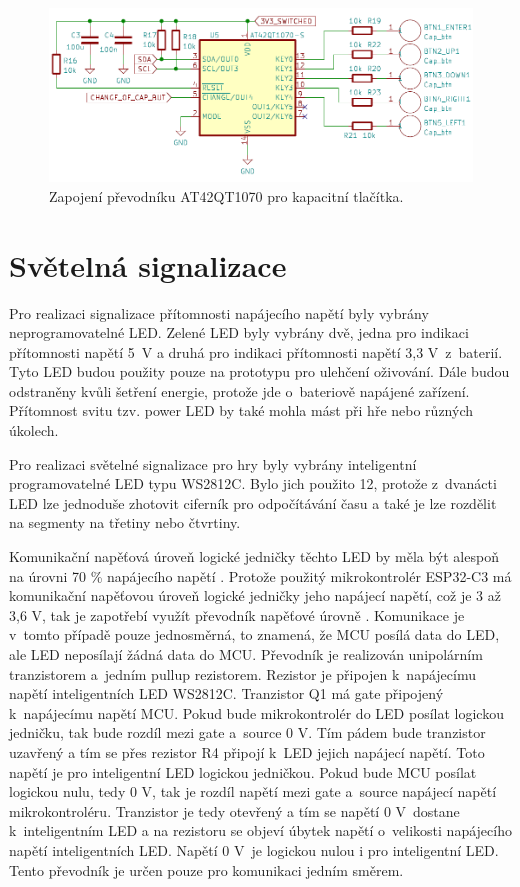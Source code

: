 \begin{figure}[!h]
    \begin{center}
      \includegraphics[scale=0.4]{obrazky/AT42QT1070.png}
    \end{center}
    \caption[Zapojení převodníku AT42QT1070 pro kapacitní tlačítka]{Zapojení převodníku AT42QT1070 pro kapacitní tlačítka.}
\end{figure}

\section{Světelná signalizace}
Pro realizaci signalizace přítomnosti napájecího napětí byly vybrány neprogramovatelné LED. Zelené LED byly vybrány dvě, jedna pro 
indikaci přítomnosti napětí 5~V a druhá pro indikaci přítomnosti napětí 3,3 V~z~baterií. Tyto LED budou použity pouze na prototypu 
pro ulehčení oživování. Dále budou odstraněny kvůli šetření energie, protože jde o~bateriově napájené zařízení. Přítomnost svitu 
tzv. power LED by také mohla mást při hře nebo různých úkolech.

Pro realizaci světelné signalizace pro hry byly vybrány inteligentní programovatelné LED typu WS2812C. Bylo jich použito 12, protože 
z~dvanácti LED lze jednoduše zhotovit ciferník pro odpočítávání času a také je lze rozdělit na segmenty na třetiny nebo čtvrtiny. 

Komunikační napěťová úroveň logické jedničky těchto LED by měla být alespoň na úrovni 70 \% napájecího napětí \cite{WS2812C_dtsh}. 
Protože použitý mikrokontrolér ESP32-C3 má komunikační napěťovou úroveň logické jedničky jeho napájecí napětí, což je 3 až 3,6 V, 
tak je zapotřebí využít převodník napěťové úrovně \cite{ESP_C3_dtsh}. Komunikace je v~tomto případě pouze jednosměrná, 
to znamená, že MCU posílá data do LED, ale LED neposílají žádná data do MCU. Převodník je realizován unipolárním tranzistorem 
a~jedním pullup rezistorem. Rezistor je připojen k~napájecímu napětí inteligentních LED WS2812C. 
Tranzistor Q1 má gate připojený k~napájecímu napětí MCU. Pokud bude mikrokontrolér do LED posílat logickou jedničku, tak bude rozdíl
mezi gate a~source 0 V. Tím pádem bude tranzistor uzavřený a tím se přes rezistor R4 připojí k~LED jejich napájecí napětí. Toto napětí 
je pro inteligentní LED logickou jedničkou. Pokud bude MCU posílat logickou nulu, tedy 0 V, tak je rozdíl napětí mezi gate a~source 
napájecí napětí mikrokontroléru. Tranzistor je tedy otevřený a tím se napětí 0 V~dostane k~inteligentním LED a na rezistoru se objeví
úbytek napětí o~velikosti napájecího napětí inteligentních LED. Napětí 0 V~je logickou nulou i pro inteligentní LED. Tento převodník
je určen pouze pro komunikaci jedním směrem. 

